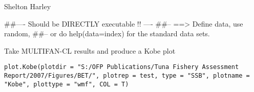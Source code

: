\documentclass[a4paper]{book}
\begin{document}
%
\begin{Arguments}
\begin{ldescription}
\item[\code{plotdir}] 


\item[\code{type}] 


\item[\code{plotrep}] 


\item[\code{impnames}] 


\item[\code{plotname}] 


\item[\code{plottype}] 


\item[\code{COL}] 


\end{ldescription}
\end{Arguments}
%
\begin{Author}\relax

Shelton Harley
\end{Author}
%
\begin{Examples}
\begin{ExampleCode}
##---- Should be DIRECTLY executable !! ----
##-- ==>  Define data, use random,
##--	or do  help(data=index)  for the standard data sets.

\end{ExampleCode}
\end{Examples}
%
\begin{Description}\relax

Take MULTIFAN-CL results and produce a Kobe plot
\end{Description}
%
\begin{Usage}
\begin{verbatim}
plot.Kobe(plotdir = "S:/OFP Publications/Tuna Fishery Assessment Report/2007/Figures/BET/", plotrep = test, type = "SSB", plotname = "Kobe", plottype = "wmf", COL = T)
\end{verbatim}
\end{Usage}
%
\begin{Arguments}
\begin{ldescription}
\item[\code{plotdir}] 


\item[\code{plotrep}] 


\item[\code{type}] 


\item[\code{plotname}] 


\item[\code{plottype}] 


\item[\code{COL}] 


\end{ldescription}
\end{Arguments}
\end{document}
